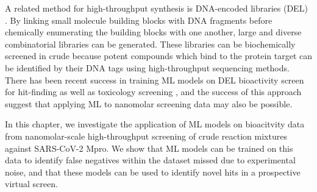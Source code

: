 A related method for high-throughput synthesis is DNA-encoded libraries (DEL) \cite{GirondaMartinez2021DNALibrary}. By linking small molecule building blocks with DNA fragments before chemically enumerating the building blocks with one another, large and diverse combinatorial libraries can be generated. These libraries can be biochemically screened in crude because potent compounds which bind to the protein target can be identified by their DNA tags using high-throughput sequencing methods. There has been recent success in training ML models on DEL bioactivity screen for hit-finding \cite{McCloskey2020DNALibrary, Lim2022DELCountML} as well as toxicology screening \cite{Blay20221DELTox}, and the success of this approach suggest that applying ML to nanomolar screening data may also be possible.

In this chapter, we investigate the application of ML models on bioacitvity data from nanomolar-scale high-throughput screening of crude reaction mixtures against SARS-CoV-2 Mpro. We show that ML models can be trained on this data to identify false negatives within the dataset missed due to experimental noise, and that these models can be used to identify novel hits in a prospective virtual screen.



